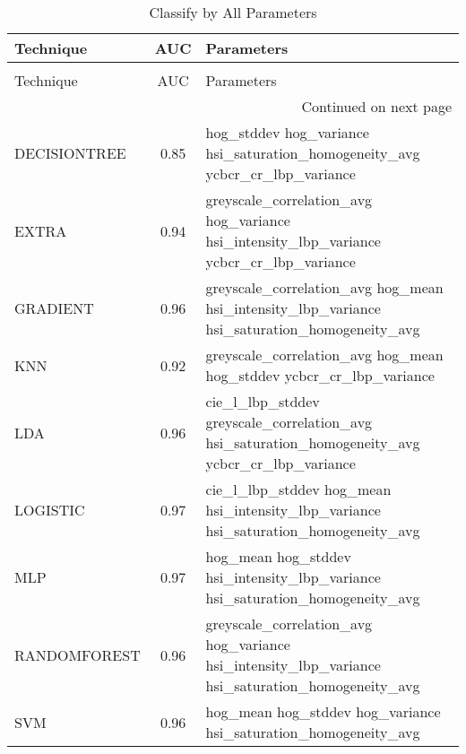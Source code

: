 \begin{longtable}{lcl}
\caption[Classify by All Parameters]{Classify by All Parameters}
\label{table:results-color-texture}\\
\toprule
   Technique &  AUC &                                                                                       Parameters \\
\midrule
\endfirsthead
\caption[]{Classify by All Parameters} \\
\toprule
   Technique &  AUC &                                                                                       Parameters \\
\midrule
\endhead
\midrule
\multicolumn{3}{r}{{Continued on next page}} \\
\midrule
\endfoot

\bottomrule
\endlastfoot
DECISIONTREE & 0.85 &                     hog\_stddev hog\_variance hsi\_saturation\_homogeneity\_avg ycbcr\_cr\_lbp\_variance \\
       EXTRA & 0.94 &          greyscale\_correlation\_avg hog\_variance hsi\_intensity\_lbp\_variance ycbcr\_cr\_lbp\_variance \\
    GRADIENT & 0.96 &     greyscale\_correlation\_avg hog\_mean hsi\_intensity\_lbp\_variance hsi\_saturation\_homogeneity\_avg \\
         KNN & 0.92 &                              greyscale\_correlation\_avg hog\_mean hog\_stddev ycbcr\_cr\_lbp\_variance \\
         LDA & 0.96 &  cie\_l\_lbp\_stddev greyscale\_correlation\_avg hsi\_saturation\_homogeneity\_avg ycbcr\_cr\_lbp\_variance \\
    LOGISTIC & 0.97 &              cie\_l\_lbp\_stddev hog\_mean hsi\_intensity\_lbp\_variance hsi\_saturation\_homogeneity\_avg \\
         MLP & 0.97 &                    hog\_mean hog\_stddev hsi\_intensity\_lbp\_variance hsi\_saturation\_homogeneity\_avg \\
RANDOMFOREST & 0.96 & greyscale\_correlation\_avg hog\_variance hsi\_intensity\_lbp\_variance hsi\_saturation\_homogeneity\_avg \\
         SVM & 0.96 &                                  hog\_mean hog\_stddev hog\_variance hsi\_saturation\_homogeneity\_avg \\
\end{longtable}
